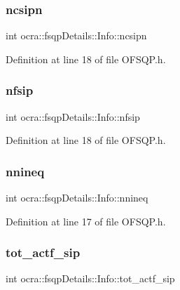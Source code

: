 \subsubsection{\texorpdfstring{ncsipn}{ncsipn}}
{\footnotesize\ttfamily int ocra\+::fsqp\+Details\+::\+Info\+::ncsipn}



Definition at line 18 of file O\+F\+S\+Q\+P.\+h.

\hypertarget{structocra_1_1fsqpDetails_1_1Info_a309b89a12115813b86319bb50d44280a}{}\label{structocra_1_1fsqpDetails_1_1Info_a309b89a12115813b86319bb50d44280a} 
\subsubsection{\texorpdfstring{nfsip}{nfsip}}
{\footnotesize\ttfamily int ocra\+::fsqp\+Details\+::\+Info\+::nfsip}



Definition at line 18 of file O\+F\+S\+Q\+P.\+h.

\hypertarget{structocra_1_1fsqpDetails_1_1Info_a572f15458f6c3b8b81f924c678696ec6}{}\label{structocra_1_1fsqpDetails_1_1Info_a572f15458f6c3b8b81f924c678696ec6} 
\subsubsection{\texorpdfstring{nnineq}{nnineq}}
{\footnotesize\ttfamily int ocra\+::fsqp\+Details\+::\+Info\+::nnineq}



Definition at line 17 of file O\+F\+S\+Q\+P.\+h.

\hypertarget{structocra_1_1fsqpDetails_1_1Info_aecb279d743b3d3e18eadbea7c0998a94}{}\label{structocra_1_1fsqpDetails_1_1Info_aecb279d743b3d3e18eadbea7c0998a94} 
\subsubsection{\texorpdfstring{tot\+\_\+actf\+\_\+sip}{tot\_actf\_sip}}
{\footnotesize\ttfamily int ocra\+::fsqp\+Details\+::\+Info\+::tot\+\_\+actf\+\_\+sip}



